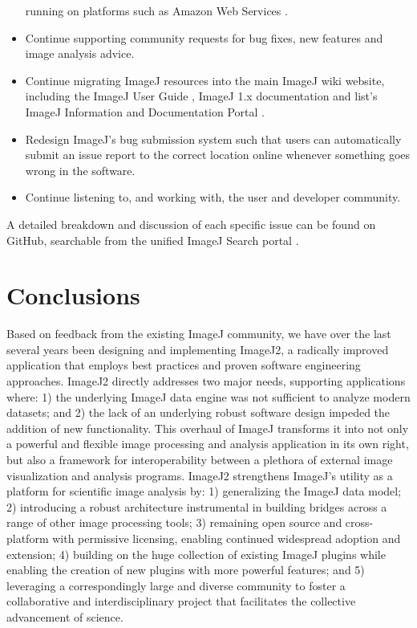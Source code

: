 \documentclass{bmcart}
\begin{document}
\begin{itemize}
    \cite{apache_spark} running on platforms such as Amazon Web Services
    \cite{aws}.
  \item Continue supporting community requests for bug fixes, new features and
    image analysis advice.
  \item Continue migrating ImageJ resources into the main ImageJ wiki website,
    including the ImageJ User Guide \cite{imagej_user_guide}, ImageJ 1.x
    documentation \cite{imagej1_docs} and \acrfull{list}'s ImageJ Information
    and Documentation Portal \cite{imagej_docu}.
  \item Redesign ImageJ's bug submission system such that users can
    automatically submit an issue report to the correct location online
    whenever something goes wrong in the software.
\item Continue listening to, and working with, the user and developer
  community.
\end{itemize}

A detailed breakdown and discussion of each specific issue can be found on
GitHub, searchable from the unified ImageJ Search portal \cite{imagej_search}.


\section*{Conclusions}
Based on feedback from the existing ImageJ community, we have over the last
several years been designing and implementing ImageJ2, a radically improved
application that employs best practices and proven software engineering
approaches. ImageJ2 directly addresses two major needs, supporting applications
where: 1) the underlying ImageJ data engine was not sufficient to analyze
modern datasets; and 2) the lack of an underlying robust software design
impeded the addition of new functionality. This overhaul of ImageJ transforms
it into not only a powerful and flexible image processing and analysis
application in its own right, but also a framework for interoperability between
a plethora of external image visualization and analysis programs. ImageJ2
strengthens ImageJ's utility as a platform for scientific image analysis by: 1)
generalizing the ImageJ data model; 2) introducing a robust architecture
instrumental in building bridges across a range of other image processing
tools; 3) remaining open source and cross-platform with permissive licensing,
enabling continued widespread adoption and extension; 4) building on the huge
collection of existing ImageJ plugins while enabling the creation of new
plugins with more powerful features; and 5) leveraging a correspondingly large
and diverse community to foster a collaborative and interdisciplinary project
that facilitates the collective advancement of science.
\end{document}
